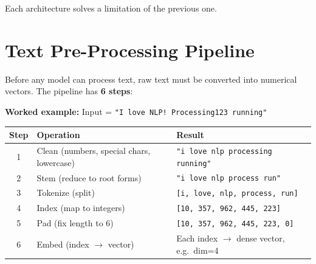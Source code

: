\documentclass[11pt,a4paper]{article}
\begin{document}
Each architecture solves a limitation of the previous one.

\section{Text Pre-Processing Pipeline}

Before any model can process text, raw text must be converted into numerical vectors. The pipeline has \textbf{6 steps}:

\begin{center}
\end{center}

\textbf{Worked example:} Input = \texttt{"I love NLP! Processing123 running"}

\begin{center}
\begin{tabular}{@{}clp{8cm}@{}}
\toprule
\textbf{Step} & \textbf{Operation} & \textbf{Result} \\
\midrule
1 & Clean (numbers, special chars, lowercase) & \texttt{"i love nlp processing running"} \\
2 & Stem (reduce to root forms) & \texttt{"i love nlp process run"} \\
3 & Tokenize (split) & \texttt{[i, love, nlp, process, run]} \\
4 & Index (map to integers) & \texttt{[10, 357, 962, 445, 223]} \\
5 & Pad (fix length to 6) & \texttt{[10, 357, 962, 445, 223, 0]} \\
6 & Embed (index $\to$ vector) & Each index $\to$ dense vector, e.g.\ dim=4 \\
\bottomrule
\end{tabular}
\end{center}
\end{document}
